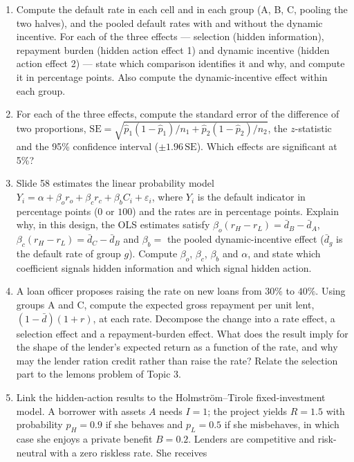 \documentclass[11pt,a4paper]{article}
\begin{document}
\begin{enumerate}
\def\labelenumi{(\alph{enumi})}
\item
  Compute the default rate in each cell and in each group (A, B, C, pooling the two halves), and the
  pooled default rates with and without the dynamic incentive. For each of the three effects ---
  selection (hidden information), repayment burden (hidden action effect 1) and dynamic incentive
  (hidden action effect 2) --- state which comparison identifies it and why, and compute it in
  percentage points. Also compute the dynamic-incentive effect within each group.
\item
  For each of the three effects, compute the standard error of the difference of two proportions,
  \(\text{SE} = \sqrt{\hat p_1(1 - \hat p_1)/n_1 + \hat p_2(1 - \hat p_2)/n_2}\), the
  \(z\)-statistic and the 95\% confidence interval (\(\pm 1.96\,\text{SE}\)). Which effects are
  significant at 5\%?
\item
  Slide 58 estimates the linear probability model
  \(Y_i = \alpha + \beta_o r_o + \beta_c r_c + \beta_b C_i + \varepsilon_i\), where \(Y_i\) is the
  default indicator in percentage points (\(0\) or \(100\)) and the rates are in percentage points.
  Explain why, in this design, the OLS estimates satisfy
  \(\beta_o (r_H - r_L) = \bar d_B - \bar d_A\), \(\beta_c (r_H - r_L) = \bar d_C - \bar d_B\) and
  \(\beta_b =\) the pooled dynamic-incentive effect (\(\bar d_g\) is the default rate of group
  \(g\)). Compute \(\beta_o\), \(\beta_c\), \(\beta_b\) and \(\alpha\), and state which coefficient
  signals hidden information and which signal hidden action.
\item
  A loan officer proposes raising the rate on new loans from \(30\%\) to \(40\%\). Using groups A
  and C, compute the expected gross repayment per unit lent, \((1 - \bar d)(1 + r)\), at each rate.
  Decompose the change into a rate effect, a selection effect and a repayment-burden effect. What
  does the result imply for the shape of the lender's expected return as a function of the rate, and
  why may the lender ration credit rather than raise the rate? Relate the selection part to the
  lemons problem of Topic 3.
\item
  Link the hidden-action results to the Holmström--Tirole fixed-investment model. A borrower with
  assets \(A\) needs \(I = 1\); the project yields \(R = 1.5\) with probability \(p_H = 0.9\) if she
  behaves and \(p_L = 0.5\) if she misbehaves, in which case she enjoys a private benefit
  \(B = 0.2\). Lenders are competitive and risk-neutral with a zero riskless rate. She receives

\end{enumerate}
\end{document}
